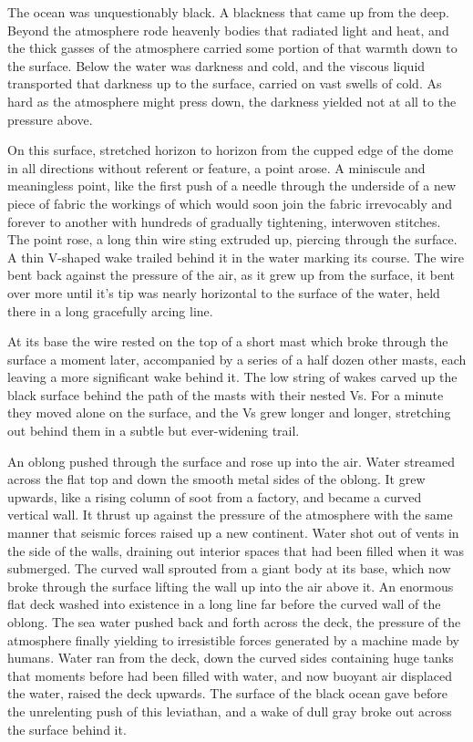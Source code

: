\documentclass[]{scrbook}
\begin{document}
The ocean was unquestionably black. A blackness that came up from the
deep. Beyond the atmosphere rode heavenly bodies that radiated light and
heat, and the thick gasses of the atmosphere carried some portion of
that warmth down to the surface. Below the water was darkness and cold,
and the viscous liquid transported that darkness up to the surface,
carried on vast swells of cold. As hard as the atmosphere might press
down, the darkness yielded not at all to the pressure above.

On this surface, stretched horizon to horizon from the cupped edge of
the dome in all directions without referent or feature, a point arose. A
miniscule and meaningless point, like the first push of a needle through
the underside of a new piece of fabric the workings of which would soon
join the fabric irrevocably and forever to another with hundreds of
gradually tightening, interwoven stitches. The point rose, a long thin
wire sting extruded up, piercing through the surface. A thin V-shaped
wake trailed behind it in the water marking its course. The wire bent
back against the pressure of the air, as it grew up from the surface, it
bent over more until it's tip was nearly horizontal to the surface of
the water, held there in a long gracefully arcing line.

At its base the wire rested on the top of a short mast which broke
through the surface a moment later, accompanied by a series of a half
dozen other masts, each leaving a more significant wake behind it. The
low string of wakes carved up the black surface behind the path of the
masts with their nested Vs. For a minute they moved alone on the
surface, and the Vs grew longer and longer, stretching out behind them
in a subtle but ever-widening trail.

An oblong pushed through the surface and rose up into the air. Water
streamed across the flat top and down the smooth metal sides of the
oblong. It grew upwards, like a rising column of soot from a factory,
and became a curved vertical wall. It thrust up against the pressure of
the atmosphere with the same manner that seismic forces raised up a new
continent. Water shot out of vents in the side of the walls, draining
out interior spaces that had been filled when it was submerged. The
curved wall sprouted from a giant body at its base, which now broke
through the surface lifting the wall up into the air above it. An
enormous flat deck washed into existence in a long line far before the
curved wall of the oblong. The sea water pushed back and forth across
the deck, the pressure of the atmosphere finally yielding to
irresistible forces generated by a machine made by humans. Water ran
from the deck, down the curved sides containing huge tanks that moments
before had been filled with water, and now buoyant air displaced the
water, raised the deck upwards. The surface of the black ocean gave
before the unrelenting push of this leviathan, and a wake of dull gray
broke out across the surface behind it.
\end{document}
